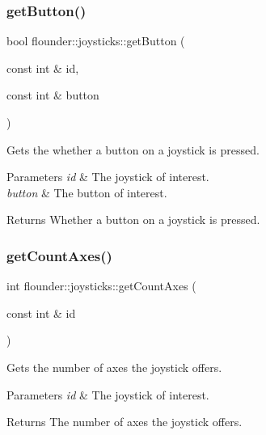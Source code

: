 \subsubsection{\texorpdfstring{get\+Button()}{getButton()}}
{\footnotesize\ttfamily bool flounder\+::joysticks\+::get\+Button (\begin{DoxyParamCaption}\item[{const int \&}]{id,  }\item[{const int \&}]{button }\end{DoxyParamCaption})}



Gets the whether a button on a joystick is pressed. 


\begin{DoxyParams}{Parameters}
{\em id} & The joystick of interest. \\
\hline
{\em button} & The button of interest. \\
\hline
\end{DoxyParams}
\begin{DoxyReturn}{Returns}
Whether a button on a joystick is pressed. 
\end{DoxyReturn}
\mbox{\label{classflounder_1_1joysticks_abe58d868cb70e9d7f2a10eb0f1b967e1}} 
\subsubsection{\texorpdfstring{get\+Count\+Axes()}{getCountAxes()}}
{\footnotesize\ttfamily int flounder\+::joysticks\+::get\+Count\+Axes (\begin{DoxyParamCaption}\item[{const int \&}]{id }\end{DoxyParamCaption})}



Gets the number of axes the joystick offers. 


\begin{DoxyParams}{Parameters}
{\em id} & The joystick of interest. \\
\hline
\end{DoxyParams}
\begin{DoxyReturn}{Returns}
The number of axes the joystick offers. 
\end{DoxyReturn}
\mbox{\label{classflounder_1_1joysticks_af502daffac227f63e673ed3f45850380}} 
